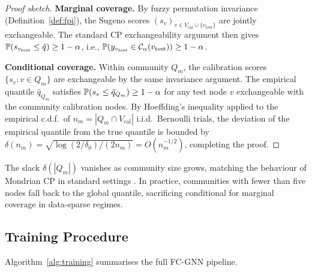\begin{proof}[Proof sketch]
\textbf{Marginal coverage.}
By fuzzy permutation invariance (Definition~\ref{def:fpi}), the Sugeno
scores $(s_v)_{v \in V_\text{cal} \cup \{v_\text{test}\}}$ are jointly
exchangeable.
The standard CP exchangeability argument \citep{angelopoulos21} then gives
$\mathbb{P}(s_{v_\text{test}} \le \hat{q}) \ge 1-\alpha$, i.e.,
$\mathbb{P}(y_{v_\text{test}} \in \mathcal{C}_\alpha(v_\text{test})) \ge 1-\alpha$.

\textbf{Conditional coverage.}
Within community $Q_m$, the calibration scores $\{s_v : v \in Q_m\}$
are exchangeable by the same invariance argument.
The empirical quantile $\hat{q}_{Q_m}$ satisfies
$\mathbb{P}(s_v \le \hat{q}_{Q_m}) \ge 1-\alpha$ for any
test node $v$ exchangeable with the community calibration nodes.
By Hoeffding's inequality applied to the empirical c.d.f.\ of
$n_m = |Q_m \cap V_\text{cal}|$ i.i.d.\ Bernoulli trials,
the deviation of the empirical quantile from the true quantile is bounded by
$\delta(n_m) = \sqrt{\log(2/\delta_0) / (2n_m)} = O(n_m^{-1/2})$,
completing the proof.
\end{proof}

\begin{remark}
The slack $\delta(|Q_m|)$ vanishes as community size grows, matching the
behaviour of Mondrian CP in standard settings \citep{rrgnn}.
In practice, communities with fewer than five nodes fall back to the
global quantile, sacrificing conditional for marginal coverage in
data-sparse regimes.
\end{remark}

\subsection{Training Procedure}

Algorithm~\ref{alg:training} summarises the full FC-GNN pipeline.

